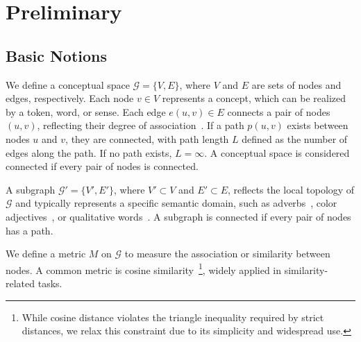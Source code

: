 \section{Preliminary}
\label{sec:preliminary}

\subsection{Basic Notions}
We define a conceptual space $\mathcal{G} = \{V, E\}$, where $V$ and $E$ are sets of nodes and edges, respectively. Each node $v \in V$ represents a concept, which can be realized by a token, word, or sense. Each edge $e(u,v) \in E$ connects a pair of nodes $(u,v)$, reflecting their degree of association~\cite{guo2012concepts}. If a path $p(u,v)$ exists between nodes $u$ and $v$, they are connected, with path length $L$ defined as the number of edges along the path. If no path exists, $L = \infty$. A conceptual space is considered connected if every pair of nodes is connected.

A subgraph $\mathcal{G'} = \{V', E'\}$, where $V' \subset V$ and $E' \subset E$, reflects the local topology of $\mathcal{G}$ and typically represents a specific semantic domain, such as adverbs~\cite{zhang2017semantic}, color adjectives~\cite{gardenfors2014geometry}, or qualitative words~\cite{perrin2010polysemous}. A subgraph is connected if every pair of nodes has a path.

We define a metric $M$ on $\mathcal{G}$ to measure the association or similarity between nodes. A common metric is cosine similarity~\footnote{While cosine distance violates the triangle inequality required by strict distances, we relax this constraint due to its simplicity and widespread use.}, widely applied in similarity-related tasks.



